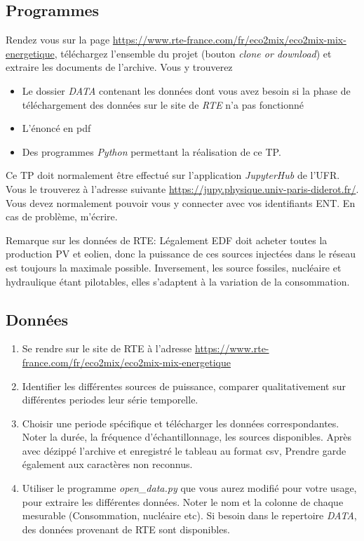 \documentclass{article}
\newcommand{\tmtextit}[1]{{\itshape{#1}}}
\begin{document}
\subsection{Programmes}

Rendez vous sur la page
\href{}{https://www.rte-france.com/fr/eco2mix/eco2mix-mix-energetique},
téléchargez l'ensemble du projet (bouton \tmtextit{clone or download}) et
extraire les documents de l'archive. Vous y trouverez
\begin{itemize}
  \item Le dossier \tmtextit{DATA} contenant les données dont vous avez
  besoin si la phase de téléchargement des données sur le site de
  \tmtextit{RTE} n'a pas fonctionné
  
  \item L'énoncé en pdf
  
  \item Des programmes \tmtextit{Python} permettant la réalisation de ce TP.
\end{itemize}
Ce TP doit normalement être effectué sur l'application \tmtextit{JupyterHub}
de l'UFR. Vous le trouverez à l'adresse suivante
\href{https://jupy.physique.univ-paris-diderot.fr/}{https://jupy.physique.univ-paris-diderot.fr/}.
Vous devez normalement pouvoir vous y connecter avec vos identifiants ENT. En
cas de problème, m'écrire.

Remarque sur les données de RTE: Légalement EDF doit acheter toutes la
production PV et eolien, donc la puissance de ces sources injectées dans le
réseau est toujours la maximale possible. Inversement, les source fossiles,
nucléaire et hydraulique étant pilotables, elles s'adaptent à la variation
de la consommation.

\subsection{Données}

\begin{enumerate}
  \item Se rendre sur le site de RTE à l'adresse
  \href{}{https://www.rte-france.com/fr/eco2mix/eco2mix-mix-energetique}
  
  \item Identifier les différentes sources de puissance, comparer
  qualitativement sur différentes periodes leur série temporelle.
  
  \item Choisir une periode spécifique et télécharger les données
  correspondantes. Noter la durée, la fréquence d'échantillonnage, les
  sources disponibles. Après avec dézippé l'archive et enregistré le
  tableau au format csv, Prendre garde également aux caractères non
  reconnus.
  
  \item Utiliser le programme \tmtextit{open\_data.py} que vous aurez modifié
  pour votre usage, pour extraire les différentes données. Noter le nom et
  la colonne de chaque mesurable (Consommation, nucléaire etc). Si besoin
  dans le repertoire \tmtextit{DATA}, des données provenant de RTE sont
  disponibles.
\end{enumerate}
\end{document}
